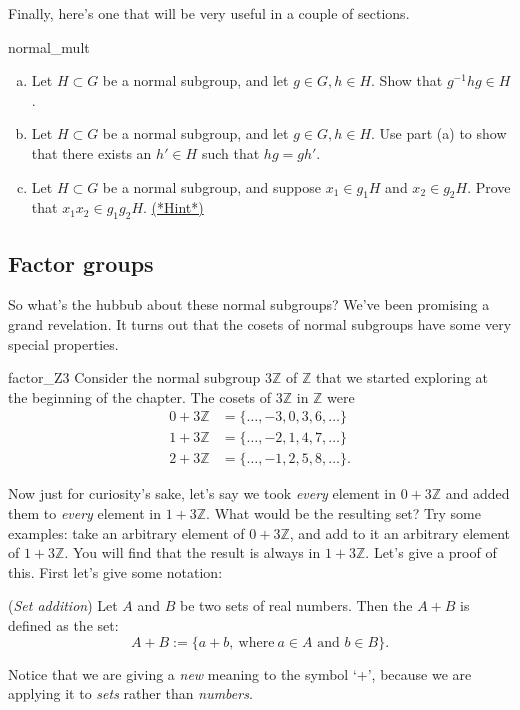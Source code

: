 {Finally, here's one that will be very useful in a couple of sections.

\begin{exercise}{normal_mult}
\begin{enumerate}[(a)]
\item
Let $H \subset G$ be a normal subgroup, and let $g \in G, h \in H$.  Show that $g^{-1}hg \in H$.
\item
Let $H \subset G$ be a normal subgroup, and let $g \in G, h \in H$. Use part (a) to show that there exists an $h' \in H$ such that $hg = g h'$.
\item
Let $H \subset G$ be a normal subgroup, and suppose $x_1 \in g_1H$ and $x_2 \in g_2H$. Prove that $x_1x_2 \in g_1g_2H$.
\hyperref[sec:cosets:hints]{(*Hint*)}
\end{enumerate}
\end{exercise}  

\subsection{Factor groups}\label{sec:factor_groups}
 
So what's the hubbub about these normal subgroups?  We've been promising a grand revelation.  It turns out that the cosets of normal subgroups have some very special properties.

\begin{example}{factor_Z3}
Consider the normal subgroup $3 {\mathbb Z}$ of ${\mathbb Z}$ that we started exploring at the beginning of the chapter. The cosets of
$3 {\mathbb Z}$ in ${\mathbb Z}$ were
\begin{align*}
0 + 3 {\mathbb Z} & = \{ \ldots, -3, 0, 3, 6, \ldots \} \\
1 + 3 {\mathbb Z} & = \{ \ldots, -2, 1, 4, 7, \ldots \} \\
2 + 3 {\mathbb Z} & = \{ \ldots, -1, 2, 5, 8, \ldots \}.
\end{align*}

Now just for curiosity's sake, let's say we took \emph{every} element in $0 + 3 {\mathbb Z}$ and added them to \emph{every} element in $1 + 3 {\mathbb Z}$.  What would be the resulting set?  Try some examples: take an arbitrary element of $0 + 3 {\mathbb Z}$, and add to it an arbitrary element of $1 + 3 {\mathbb Z}$. You will find that the result is always in $1 + 3 {\mathbb Z}$. Let's give a proof of this. First let's give some notation:

\begin{defn}\label{setplus}(\emph{Set addition})  Let $A$ and $B$ be two sets of real numbers.  Then the  $A + B$ is defined as the set:
\[ A + B := \{a + b, \mathrm{~where~} a \in A \text{ and } b \in B\} .\]
\end{defn}
\noindent
Notice that we are giving a \emph{new} meaning to the symbol `+', because we are applying it to \emph{sets} rather than \emph{numbers}. 


\end{example}}
